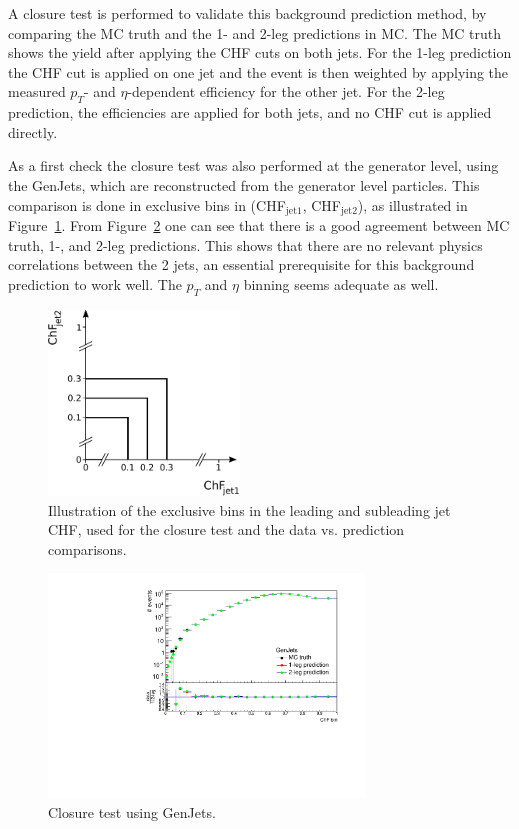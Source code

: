 A closure test is performed to validate this background prediction method, by comparing the MC truth and the 1- and 2-leg predictions in MC. The MC truth shows the yield after applying the CHF cuts on both jets. For the 1-leg prediction the CHF cut is applied on one jet and the event is then weighted by applying the measured $p_T$- and $\eta$-dependent efficiency for the other jet. For the 2-leg prediction, the efficiencies are applied for both jets, and no CHF cut is applied directly.

As a first check the closure test was also performed at the generator level, using the GenJets, which are reconstructed from the generator level particles. This comparison is done in exclusive bins in (CHF$_{\mathrm{jet 1}}$, CHF$_{\mathrm{jet 2}}$), as illustrated in Figure~\ref{fig:excl_binning}. From Figure~\ref{fig:closuretest_GenJets} one can see that there is a good agreement between MC truth, 1-, and 2-leg predictions. This shows that there are no relevant physics correlations between the 2 jets, an essential prerequisite for this background prediction to work well. The $p_T$ and $\eta$ binning seems adequate as well.

\begin{figure}[ht]
  \centering
  \includegraphics[width=0.45\textwidth]{figures/exclusive_binning.pdf}\hfill%
  \caption{Illustration of the exclusive bins in the leading and subleading jet CHF, used for the closure test and the data vs. prediction comparisons.}
  \label{fig:excl_binning}
\end{figure}

\begin{figure}[ht]
  \centering
  \includegraphics[width=0.75\textwidth]{figures/closure_test_QCD_GenJets_exclusive_correct.pdf}\hfill%
  \caption{Closure test using GenJets.}
  \label{fig:closuretest_GenJets}
\end{figure}

